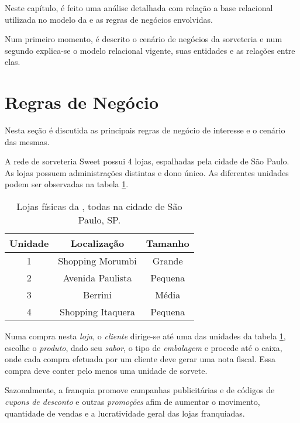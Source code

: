\label{chap:RelationalModel}Neste capítulo, é feito uma análise detalhada com relação a base
relacional utilizada no modelo da \emph{\databaseName{}} e as regras de negócios envolvidas. 

Num primeiro momento, é descrito o cenário de negócios da sorveteria e num segundo explica-se o modelo
relacional vigente, suas entidades e as relações entre elas.

\section{Regras de Negócio}
\label{section:BusinessRules}
Nesta seção é  discutida as principais regras de negócio de interesse e o cenário das mesmas.

A rede de sorveteria Sweet possui 4 lojas, espalhadas pela cidade de São Paulo. As lojas possuem administrações distintas e dono único. As diferentes unidades podem ser observadas na tabela \ref{table:StoreUnits}.

\begin{center}
  \begin{table}[h]
\begin{centering}
\begin{tabular}{c|c|c}
\hline 
Unidade & Localização & Tamanho\tabularnewline
\hline 
1 & Shopping Morumbi & Grande\tabularnewline
\hline 
2 & Avenida Paulista & Pequena\tabularnewline
\hline 
3 & Berrini & Média\tabularnewline
\hline 
4 & Shopping Itaquera & Pequena\tabularnewline
\hline 
\end{tabular}
\par\end{centering}
\caption{\label{table:StoreUnits} Lojas físicas da \storeName{}, todas na cidade de São Paulo, SP.}
\end{table}
\vspace*{-40pt}
\par\end{center}

Numa compra nesta \emph{loja}, o \emph{cliente} dirige-se até uma das unidades da tabela \ref{table:StoreUnits}, escolhe o \emph{produto}, dado seu \emph{sabor}, o tipo de \emph{embalagem} e procede até o caixa, onde cada compra efetuada por um cliente deve gerar uma nota fiscal. Essa compra deve conter pelo menos uma unidade de sorvete. 

Sazonalmente, a franquia promove campanhas publicitárias e de códigos de \emph{cupons de desconto} e outras \emph{promoções} afim de aumentar o movimento, quantidade de vendas e a lucratividade geral das lojas franquiadas.

